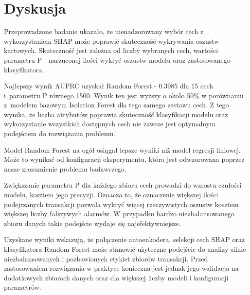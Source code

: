 \documentclass [runningheads]{llncs}
\begin{document}
\section*{Dyskusja}
Przeprowadzone badanie ukazało, że nienadzorowany wybór cech z wykorzystaniem SHAP może poprawić skuteczność wykrywania oszustw kartowych. Skuteczność jest zależna od liczby wybranych cech, wartości parametru P - narzuconej ilości wykryć oszustw modelu oraz zastosowanego klasyfikatora. 

Najlepszy wynik AUPRC uzyskał Random Forest - 0.3985 dla 15 cech i~parametru P równego 1500. Wynik ten jest wyższy o około 50\% w porównaniu z~modelem bazowym Isolation Forest dla tego samego zestawu cech. Z tego wynika, że liczba atrybutów poprawia skuteczność klasyfikacji modelu oraz wykorzystanie wszystkich dostępnych cech nie zawsze jest optymalnym podejściem do rozwiązania problemu.

Model Random Forest na ogół osiągał lepsze wyniki niż model regresji liniowej. Może to wynikać od konfiguracji eksperymentu, która jest odwzorowana poprzez nasze zrozumienie problemu badawczego. 

Zwiększanie parametru P dla każdego zbioru cech prowadzi do wzrostu czułości modelu, kosztem jego precyzji. Oznacza to, że oznaczenie większej ilości podejrzanych transakcji pozwala wykryć więcej rzeczywistych oszustw kosztem większej liczby fałszywych alarmów. W przypadku bardzo niezbalansowanego zbioru danych takie podejście wydaje się najefektywniejsze.

Uzyskane wyniki wskazują, że połączenie autoenkodera, selekcji cech
SHAP oraz klasyfikatora Random Forest może stanowić użyteczne
podejście do analizy silnie niezbalansowanych i pozbawionych
etykiet zbiorów transakcji. Przed zastosowaniem rozwiązania w praktyce 
konieczna jest jednak jego walidacja na dodatkowych 
zbiorach danych oraz dla większej liczby modeli i konfiguracji parametrów.
\end{document}
